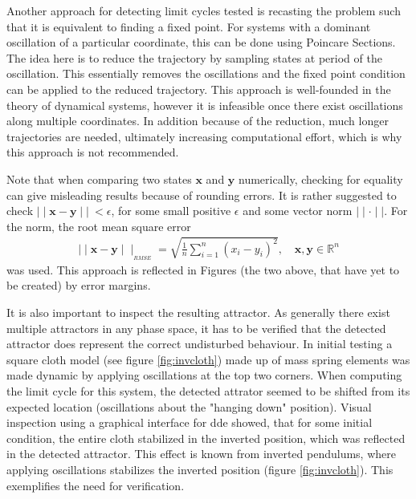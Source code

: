 Another approach for detecting limit cycles tested is recasting the problem such that it is equivalent to finding a fixed point. For systems with a dominant oscillation of a particular coordinate, this can be done using Poincare Sections. The idea here is to reduce the trajectory by sampling states at period of the oscillation. This essentially removes the oscillations and the fixed point condition can be applied to the reduced trajectory. This approach is well-founded in the theory of dynamical systems, however it is infeasible once there exist oscillations along multiple coordinates. In addition because of the reduction, much longer trajectories are needed, ultimately increasing computational effort, which is why this approach is not recommended. 

Note that when comparing two states $\mathbf{x}$ and $\mathbf{y}$ numerically, checking for equality can give misleading results because of rounding errors. It is rather suggested to check $\mid\mid \mathbf{x} - \mathbf{y} \mid\mid\ < \epsilon$, for some small positive $\epsilon$ and some vector norm $\mid\mid\cdot\mid\mid$. For the norm, the root mean square error \begin{gather}\mid\mid \mathbf{x} - \mathbf{y} \mid\mid_{_{RMSE}} = \sqrt{\frac{1}{n}\sum_{i=1}^{n}(x_i-y_i)^2},\quad \mathbf{x},\mathbf{y} \in \mathbb{R}^n\end{gather}was used. This approach is reflected in Figures (the two above, that have yet to be created) by error margins. 

It is also important to inspect the resulting attractor. As generally there exist multiple attractors in any phase space, it has to be verified that the detected attractor does represent the correct undisturbed behaviour. In initial testing a square cloth model (see figure \ref{fig:invcloth}) made up of mass spring elements was made dynamic by applying oscillations at the top two corners. When computing the limit cycle for this system, the detected attrator seemed to be shifted from its expected location (oscillations about the "hanging down" position). Visual inspection using a graphical interface for dde showed, that for some initial condition, the entire cloth stabilized in the inverted position, which was reflected in the detected attractor. This effect is known from inverted pendulums, where applying oscillations stabilizes the inverted position (figure \ref{fig:invcloth}). This exemplifies the need for verification.  

